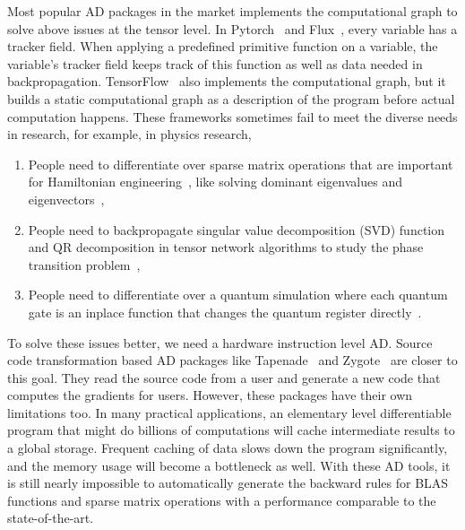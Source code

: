 \documentclass{article}
\newcommand{\<}{\langle}
\renewcommand{\>}{\rangle}
\theoremstyle{definition}\newtheorem{definition}{\textit{Definition}}
\begin{document}
    Most popular AD packages in the market implements the computational graph to solve above issues at the tensor level.
    In Pytorch~\cite{Paszke2017} and Flux~\cite{Innes2018a}, every variable has a tracker field. When applying a predefined primitive function on a variable, the variable's tracker field keeps track of this function as well as data needed in backpropagation.
    TensorFlow~\cite{Tensorflow2015} also implements the computational graph, but it builds a static computational graph as a description of the program before actual computation happens.
    These frameworks sometimes fail to meet the diverse needs in research, for example, in physics research,
    \begin{enumerate}
        \item People need to differentiate over sparse matrix operations that are important for Hamiltonian engineering~\cite{Xie2020}, like solving dominant eigenvalues and eigenvectors~\cite{Golub2012},
        \item People need to backpropagate singular value decomposition (SVD) function and QR decomposition in tensor network algorithms to study the phase transition problem~\cite{Golub2012,Liao2019,Seeger2017,Wan2019,Hubig2019,Wan2019},
        \item People need to differentiate over a quantum simulation where each quantum gate is an inplace function that changes the quantum register directly~\cite{Luo2019}.
    \end{enumerate}

    To solve these issues better, we need a hardware instruction level AD. Source code transformation based AD packages like Tapenade~\cite{Hascoet2013} and Zygote~\cite{Innes2018, Innes2019} are closer to this goal. They read the source code from a user and generate a new code that computes the gradients for users. However, these packages have their own limitations too. In many practical applications, an elementary level differentiable program that might do billions of computations will cache intermediate results to a global storage. Frequent caching of data slows down the program significantly, and the memory usage will become a bottleneck as well. With these AD tools, it is still nearly impossible to automatically generate the backward rules for BLAS functions and sparse matrix operations with a performance comparable to the state-of-the-art.%
\end{document}
